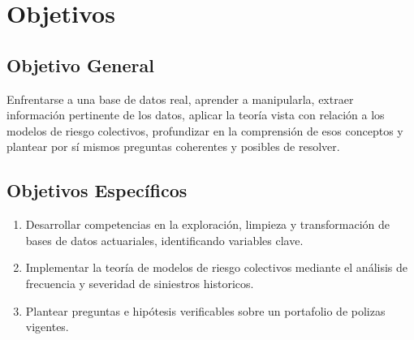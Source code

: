 \section{Objetivos}

\subsection{Objetivo General}
Enfrentarse a una base de datos real, aprender a manipularla, extraer información pertinente de los datos, aplicar la teoría vista con relación a los modelos de riesgo colectivos, profundizar en la comprensión de esos conceptos y plantear por sí mismos preguntas coherentes y posibles de resolver.

\subsection{Objetivos Específicos}

\begin{enumerate}
    \item Desarrollar competencias en la exploración, limpieza y transformación de bases de datos actuariales, identificando variables clave.
    
    \item Implementar la teoría de modelos de riesgo colectivos mediante el análisis de frecuencia y severidad de siniestros historicos.

    \item Plantear preguntas e hipótesis verificables sobre un portafolio de polizas vigentes.
\end{enumerate}